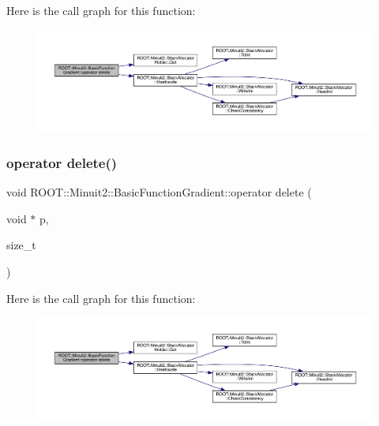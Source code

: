 Here is the call graph for this function\+:
\nopagebreak
\begin{figure}[H]
\begin{center}
\leavevmode
\includegraphics[width=350pt]{db/d85/classROOT_1_1Minuit2_1_1BasicFunctionGradient_acc4585a778dae54497b4c4342a4dcd1e_cgraph}
\end{center}
\end{figure}
\mbox{\label{classROOT_1_1Minuit2_1_1BasicFunctionGradient_acc4585a778dae54497b4c4342a4dcd1e}} 
\subsubsection{\texorpdfstring{operator delete()}{operator delete()}\hspace{0.1cm}{\footnotesize\ttfamily [3/3]}}
{\footnotesize\ttfamily void R\+O\+O\+T\+::\+Minuit2\+::\+Basic\+Function\+Gradient\+::operator delete (\begin{DoxyParamCaption}\item[{void $\ast$}]{p,  }\item[{size\+\_\+t}]{ }\end{DoxyParamCaption})\hspace{0.3cm}{\ttfamily [inline]}}

Here is the call graph for this function\+:
\nopagebreak
\begin{figure}[H]
\begin{center}
\leavevmode
\includegraphics[width=350pt]{db/d85/classROOT_1_1Minuit2_1_1BasicFunctionGradient_acc4585a778dae54497b4c4342a4dcd1e_cgraph}
\end{center}
\end{figure}
\mbox{\label{classROOT_1_1Minuit2_1_1BasicFunctionGradient_a2b08ebb0074a43cfca91f74991c660d5}} 
